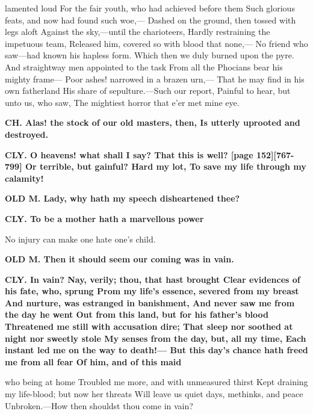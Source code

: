 \documentclass[11pt,letter]{book}
\begin{document}
lamented loud For the fair youth, who had achieved before them Such glorious feats, and now had found such woe,— Dashed on the ground, then tossed with legs aloft Against the sky,—until the charioteers, Hardly restraining the impetuous team, Released him, covered so with blood that none,— No friend who saw—had known his hapless form. Which then we duly burned upon the pyre. And straightway men appointed to the task From all the Phocians bear his mighty frame— Poor ashes! narrowed in a brazen urn,— That he may find in his own fatherland His share of sepulture.—Such our report, Painful to hear, but unto us, who saw, The mightiest horror that e’er met mine eye.

\par \textbf{CH. Alas! the stock of our old masters, then, Is utterly uprooted and destroyed.}
\par 

\par \textbf{CLY. O heavens! what shall I say? That this is well? [page 152][767-799] Or terrible, but gainful? Hard my lot, To save my life through my calamity!}
\par 

\par \textbf{OLD M. Lady, why hath my speech disheartened thee?}
\par 

\par \textbf{CLY. To be a mother hath a marvellous power}
\par   No injury can make one hate one’s child.

\par \textbf{OLD M. Then it should seem our coming was in vain.}
\par 

\par \textbf{CLY. In vain? Nay, verily; thou, that hast brought Clear evidences of his fate, who, sprung Prom my life’s essence, severed from my breast And nurture, was estranged in banishment, And never saw me from the day he went Out from this land, but for his father’s blood Threatened me still with accusation dire; That sleep nor soothed at night nor sweetly stole My senses from the day, but, all my time, Each instant led me on the way to death!— But this day’s chance hath freed me from all fear Of him, and of this maid}
\par   who being at home Troubled me more, and with unmeasured thirst Kept draining my life-blood; but now her threats Will leave us quiet days, methinks, and peace Unbroken.—How then shouldst thou come in vain?
\end{document}
